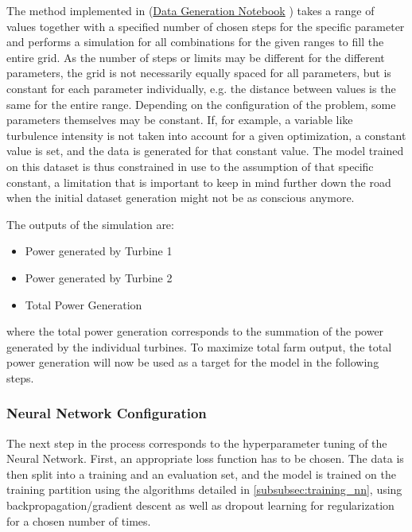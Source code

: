 The method implemented in (\href{https://github.com/schmeti/uc3m_TFM_wind_farm_optimization_codebase/blob/main/Windfarm_power_modelling/generate_data_floris.ipynb}{Data Generation Notebook} \cite{schmetz2025_gendata_git}) takes a range of values together with a specified number of chosen steps for the specific parameter and performs a simulation for all combinations for the given ranges to fill the entire grid. As the number of steps or limits may be different for the different parameters, the grid is not necessarily equally spaced for all parameters, but is constant for each parameter individually, e.g. the distance between values is the same for the entire range.  
Depending on the configuration of the problem, some parameters themselves may be constant. If, for example, a variable like turbulence intensity is not taken into account for a given optimization, a constant value is set, and the data is generated for that constant value. The model trained on this dataset is thus constrained in use to the assumption of that specific constant, a limitation that is important to keep in mind further down the road when the initial dataset generation might not be as conscious anymore. 

The outputs of the simulation are:
\begin{itemize}
	\item Power generated by Turbine 1
	\item Power generated by Turbine 2
	\item Total Power Generation
\end{itemize}

where the total power generation corresponds to the summation of the power generated by the individual turbines. To maximize total farm output, the total power generation will now be used as a target for the model in the following steps.

\subsubsection{Neural Network Configuration}

The next step in the process corresponds to the hyperparameter tuning of the Neural Network. First, an appropriate loss function has to be chosen. The data is then split into a training and an evaluation set, and the model is trained on the training partition using the algorithms detailed in  \ref{subsubsec:training_nn}, using backpropagation/gradient descent as well as dropout learning for regularization for a chosen number of times.  

